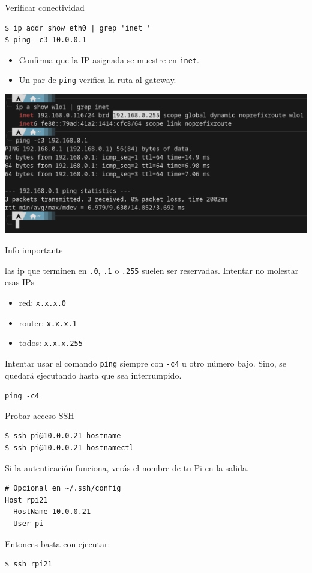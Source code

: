 \documentclass[aspectratio=169,professionalfonts]{beamer}
\begin{document}
\begin{frame}[fragile]{Verificar conectividad}
  \begin{verbatim}
$ ip addr show eth0 | grep 'inet '
$ ping -c3 10.0.0.1
  \end{verbatim}
  \begin{itemize}
    \item Confirma que la IP asignada se muestre en \texttt{inet}.
    \item Un par de \texttt{ping} verifica la ruta al gateway.
  \end{itemize}
  \begin{center}
    \includegraphics[width=.6\textwidth]{ipping.png}
  \end{center}
\end{frame}

\begin{frame}[fragile]{Info importante}
  \begin{infobox}
    las ip que terminen en \texttt{.0}, \texttt{.1} o \texttt{.255} suelen ser reservadas. Intentar no molestar esas IPs

    \begin{itemize}
      \item red: \texttt{x.x.x.0}
      \item router: \texttt{x.x.x.1}
      \item todos: \texttt{x.x.x.255}
    \end{itemize}
  \end{infobox}
  \begin{infobox}
    Intentar usar el comando \texttt{ping} siempre con \texttt{-c4} u otro número bajo. Sino, se quedará ejecutando hasta que sea interrumpido.

    \texttt{ping -c4}
  \end{infobox}
\end{frame}

\begin{frame}[fragile]{Probar acceso SSH}
  \begin{verbatim}
$ ssh pi@10.0.0.21 hostname
$ ssh pi@10.0.0.21 hostnamectl
  \end{verbatim}
  Si la autenticación funciona, verás el nombre de tu Pi en la salida.
  \begin{verbatim}
# Opcional en ~/.ssh/config
Host rpi21
  HostName 10.0.0.21
  User pi
  \end{verbatim}
  Entonces basta con ejecutar:
  \begin{verbatim}
$ ssh rpi21
  \end{verbatim}
\end{frame}
\end{document}
